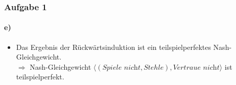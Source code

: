 \documentclass{beamer}
\begin{document}
\begin{frame}
	\frametitle{Aufgabe 1}
	\framesubtitle{e)}

	\begin{itemize}
		\item Das Ergebnis der Rückwärtsinduktion ist ein teilspielperfektes Nash-Gleichgewicht.\\
		$\Rightarrow$ Nash-Gleichgewicht $\bigl\langle(\textit{Spiele nicht}, Stehle), \textit{Vertraue nicht}\bigr\rangle$ ist teilspielperfekt.
	\end{itemize}


\end{frame}
\end{document}
